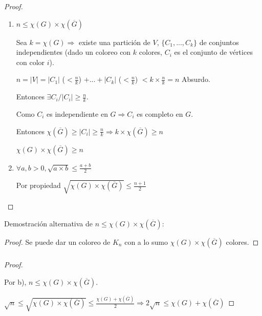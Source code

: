 \subsubsection{}
\begin{proof}
	\begin{enumerate}
		\item {
			$n \leq \chi(G) \times \chi(\overline{G})$

			Sea $k = \chi(G) \Longrightarrow$ existe una partición de $V$, $\{C_1, ..., C_k\}$ de conjuntos independientes (dado un coloreo con $k$ colores, $C_i$ es el conjunto de vértices con color $i$).

			$n = |V| = |C_1|$ ($< \frac{n}{k}$) $ + ... + |C_k|$ ($< \frac{n}{k}$) $< k \times \frac{n}{k} = n$ Absurdo.

			Entonces $\exists C_i / |C_i| \geq \frac{n}{k}$.

			Como $C_i$ es independiente en $G \Longrightarrow C_i$ es completo en $G$.

			Entonces $\chi(\overline{G}) \geq |C_i| \geq \frac{n}{k} \Longrightarrow k \times \chi(\overline{G}) \geq n $

			$\chi(G) \times \chi(\overline{G}) \geq n$
		}
		\item {
			\begin{prop}
			\label{CBC}
				$\forall a, b > 0, \sqrt{a \times b} \leq \frac{a + b}{2}$
			\end{prop}

			Por propiedad $\sqrt{\chi(G) \times \chi(\overline{G})} \leq \frac{n + 1}{2}$
		}
	\end{enumerate}
\end{proof}

Demostración alternativa de $n \leq \chi(G) \times \chi(\overline{G})$:

\begin{proof}
	Se puede dar un coloreo de $K_n$ con a lo sumo $\chi(G) \times \chi(\overline{G})$ colores.
\end{proof}

\subsubsection{}
\begin{proof}

	~
	
	Por b), $n \leq \chi(G) \times \chi(\overline{G})$.

	$\sqrt{n} \leq \sqrt{\chi(G) \times \chi(\overline{G})} \leq \frac{\chi(G) + \chi(\overline{G})}{2} \Longrightarrow 2 \sqrt{n} \leq \chi(G) + \chi(\overline{G})$
\end{proof}

